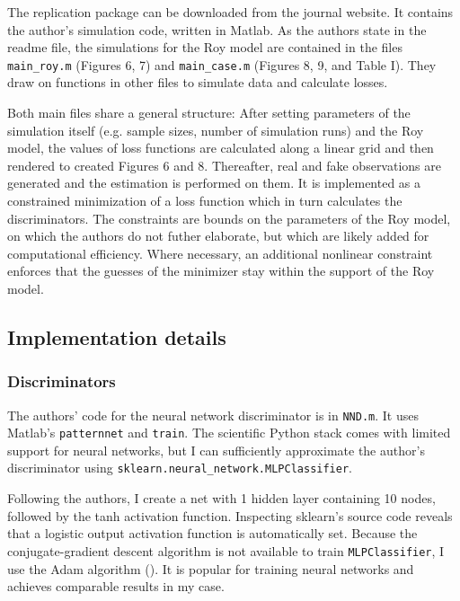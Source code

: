 The replication package can be downloaded from the journal website.
It contains the author's simulation code, written in Matlab. %
As the authors state in the readme file, the simulations for the Roy model are contained in the files \texttt{main\_roy.m} (Figures 6, 7) and \texttt{main\_case.m} (Figures 8, 9, and Table I).
They draw on functions in other files to simulate data and calculate losses.

Both main files share a general structure:
After setting parameters of the simulation itself (e.g. sample sizes, number of simulation runs) and the Roy model, the values of loss functions are calculated along a linear grid and then rendered to created Figures 6 and 8.
Thereafter, real and fake observations are generated and the estimation is performed on them.
It is implemented as a constrained minimization of a loss function which in turn calculates the discriminators. %
The constraints are bounds on the parameters of the Roy model, on which the authors do not futher elaborate, but which are likely added for computational efficiency. %
Where necessary, an additional nonlinear constraint enforces that the guesses of the minimizer stay within the support of the Roy model.



\subsection{Implementation details}
\label{sec:Implementation}

\subsubsection{Discriminators}

The authors' code for the neural network discriminator is in \texttt{NND.m}.
It uses Matlab's \texttt{patternnet} and \texttt{train}.
The scientific Python stack comes with limited support for neural networks, but I can sufficiently approximate the author's discriminator using \texttt{sklearn.neural\_network.MLPClassifier}.

Following the authors, I create a net with 1 hidden layer containing 10 nodes, followed by the tanh activation function.
Inspecting sklearn's source code reveals that a logistic output activation function is automatically set. %
Because the conjugate-gradient descent algorithm is not available to train \texttt{MLPClassifier}, I use the Adam algorithm (\textcite{diederik2014adam}).
It is popular for training neural networks and achieves comparable results in my case. %

